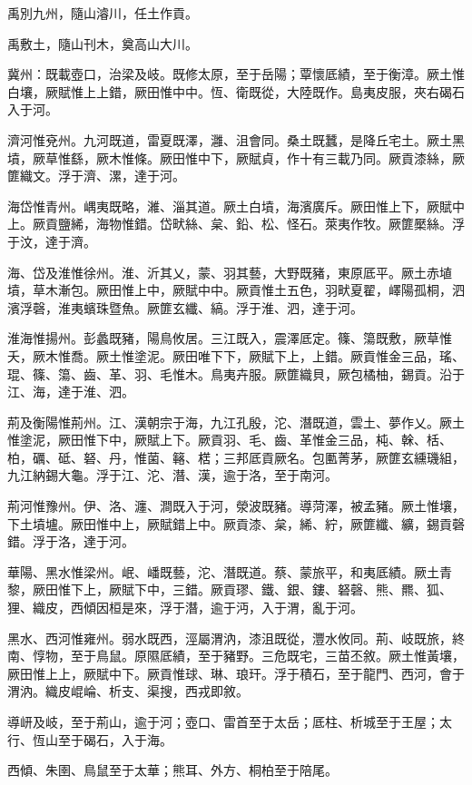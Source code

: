 
\begin{pinyinscope}
禹別九州，隨山濬川，任土作貢。

禹敷土，隨山刊木，奠高山大川。

冀州：既載壺口，治梁及岐。既修太原，至于岳陽；覃懷厎績，至于衡漳。厥土惟白壤，厥賦惟上上錯，厥田惟中中。恆、衛既從，大陸既作。島夷皮服，夾右碣石入于河。

濟河惟兗州。九河既道，雷夏既澤，灉、沮會同。桑土既蠶，是降丘宅土。厥土黑墳，厥草惟繇，厥木惟條。厥田惟中下，厥賦貞，作十有三載乃同。厥貢漆絲，厥篚織文。浮于濟、漯，達于河。

海岱惟青州。嵎夷既略，濰、淄其道。厥土白墳，海濱廣斥。厥田惟上下，厥賦中上。厥貢鹽絺，海物惟錯。岱畎絲、枲、鉛、松、怪石。萊夷作牧。厥篚檿絲。浮于汶，達于濟。

海、岱及淮惟徐州。淮、沂其乂，蒙、羽其藝，大野既豬，東原厎平。厥土赤埴墳，草木漸包。厥田惟上中，厥賦中中。厥貢惟土五色，羽畎夏翟，嶧陽孤桐，泗濱浮磬，淮夷蠙珠暨魚。厥篚玄纖、縞。浮于淮、泗，達于河。

淮海惟揚州。彭蠡既豬，陽鳥攸居。三江既入，震澤厎定。篠、簜既敷，厥草惟夭，厥木惟喬。厥土惟塗泥。厥田唯下下，厥賦下上，上錯。厥貢惟金三品，瑤、琨、篠、簜、齒、革、羽、毛惟木。鳥夷卉服。厥篚織貝，厥包橘柚，錫貢。沿于江、海，達于淮、泗。

荊及衡陽惟荊州。江、漢朝宗于海，九江孔殷，沱、潛既道，雲土、夢作乂。厥土惟塗泥，厥田惟下中，厥賦上下。厥貢羽、毛、齒、革惟金三品，杶、榦、栝、柏，礪、砥、砮、丹，惟菌、簵、楛；三邦厎貢厥名。包匭菁茅，厥篚玄纁璣組，九江納錫大龜。浮于江、沱、潛、漢，逾于洛，至于南河。

荊河惟豫州。伊、洛、瀍、澗既入于河，滎波既豬。導菏澤，被孟豬。厥土惟壤，下土墳壚。厥田惟中上，厥賦錯上中。厥貢漆、枲，絺、紵，厥篚纖、纊，錫貢磬錯。浮于洛，達于河。

華陽、黑水惟梁州。岷、嶓既藝，沱、潛既道。蔡、蒙旅平，和夷厎績。厥土青黎，厥田惟下上，厥賦下中，三錯。厥貢璆、鐵、銀、鏤、砮磬、熊、羆、狐、狸、織皮，西傾因桓是來，浮于潛，逾于沔，入于渭，亂于河。

黑水、西河惟雍州。弱水既西，涇屬渭汭，漆沮既從，灃水攸同。荊、岐既旅，終南、惇物，至于鳥鼠。原隰厎績，至于豬野。三危既宅，三苗丕敘。厥土惟黃壤，厥田惟上上，厥賦中下。厥貢惟球、琳、琅玕。浮于積石，至于龍門、西河，會于渭汭。織皮崐崘、析支、渠搜，西戎即敘。

導岍及岐，至于荊山，逾于河；壺口、雷首至于太岳；厎柱、析城至于王屋；太行、恆山至于碣石，入于海。

西傾、朱圉、鳥鼠至于太華；熊耳、外方、桐柏至于陪尾。


\end{pinyinscope}
